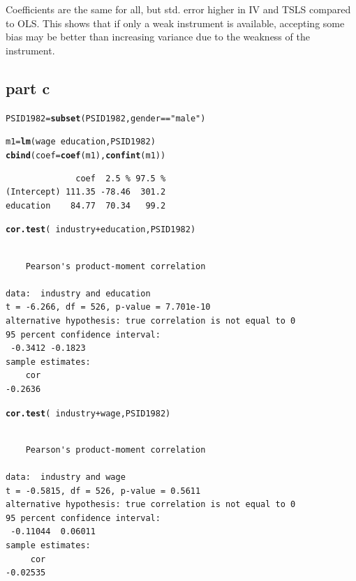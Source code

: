 \documentclass{article}\usepackage{graphicx, color}
\makeatletter
\newcommand{\hlfunctioncall}[1]{\textcolor[rgb]{0.501960784313725,0,0.329411764705882}{\textbf{#1}}}%
\newcommand{\hlstring}[1]{\textcolor[rgb]{0.6,0.6,1}{#1}}%
\newenvironment{kframe}{%
 \def\at@end@of@kframe{}%
 \ifinner\ifhmode%
  \def\at@end@of@kframe{\end{minipage}}%
  \begin{minipage}{\columnwidth}%
 \fi\fi%
 \def\FrameCommand##1{\hskip\@totalleftmargin \hskip-\fboxsep
 \colorbox{shadecolor}{##1}\hskip-\fboxsep
     \hskip-\linewidth \hskip-\@totalleftmargin \hskip\columnwidth}%
 \MakeFramed {\advance\hsize-\width
   \@totalleftmargin\z@ \linewidth\hsize
   \@setminipage}}%
 {\par\unskip\endMakeFramed%
 \at@end@of@kframe}
\newenvironment{knitrout}{}{} %
\makeatother
\begin{document}
Coefficients are the same for all, but std. error higher in IV and TSLS compared to OLS. This shows that if only a weak instrument is available, accepting some bias may be better than increasing variance due to the weakness of the instrument.

\subsection*{part c}
\begin{knitrout}
\color{fgcolor}\begin{kframe}
\begin{alltt}
PSID1982=\hlfunctioncall{subset}(PSID1982, gender==\hlstring{"male"})

m1=\hlfunctioncall{lm}(wage~education, PSID1982)
\hlfunctioncall{cbind}(coef=\hlfunctioncall{coef}(m1),\hlfunctioncall{confint}(m1))
\end{alltt}
\begin{verbatim}
              coef  2.5 % 97.5 %
(Intercept) 111.35 -78.46  301.2
education    84.77  70.34   99.2
\end{verbatim}
\begin{alltt}

\hlfunctioncall{cor.test}(~industry+education, PSID1982)
\end{alltt}
\begin{verbatim}

	Pearson's product-moment correlation

data:  industry and education 
t = -6.266, df = 526, p-value = 7.701e-10
alternative hypothesis: true correlation is not equal to 0 
95 percent confidence interval:
 -0.3412 -0.1823 
sample estimates:
    cor 
-0.2636 

\end{verbatim}
\begin{alltt}
\hlfunctioncall{cor.test}(~industry+wage, PSID1982)
\end{alltt}
\begin{verbatim}

	Pearson's product-moment correlation

data:  industry and wage 
t = -0.5815, df = 526, p-value = 0.5611
alternative hypothesis: true correlation is not equal to 0 
95 percent confidence interval:
 -0.11044  0.06011 
sample estimates:
     cor 
-0.02535 

\end{verbatim}
\begin{alltt}


\end{alltt}
\end{kframe}
\end{knitrout}
\end{document}
